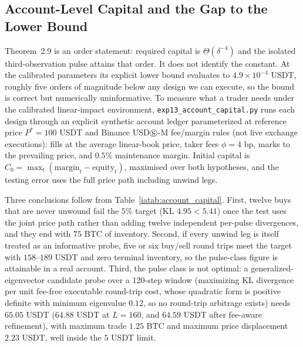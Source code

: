 \documentclass[12pt]{article}
\theoremstyle{definition}
\theoremstyle{remark}
\begin{document}
\subsection{Account-Level Capital and the Gap to the Lower Bound}
\label{ia:account_capital}

Theorem~2.9 is an order statement: required capital is $\Theta(\delta^{-4})$ and the isolated third-observation pulse attains that order. It does not identify the constant. At the calibrated parameters its explicit lower bound evaluates to $4.9\times10^{-4}$ USDT, roughly five orders of magnitude below any design we can execute, so the bound is correct but numerically uninformative. To measure what a trader needs under the calibrated linear-impact environment, \texttt{exp13\_account\_capital.py} runs each design through an explicit synthetic account ledger parameterized at reference price $P^* = 100$ USDT and Binance USD$\circledS$-M fee/margin rules (not live exchange executions): fills at the average linear-book price, taker fees $\phi=4$ bp, marks to the prevailing price, and $0.5\%$ maintenance margin. Initial capital is $C_0=\max_t(\text{margin}_t-\text{equity}_t)$, maximised over both hypotheses, and the testing error uses the full price path including unwind legs.



Three conclusions follow from Table~\ref{iatab:account_capital}. First, twelve buys that are never unwound fail the $5\%$ target (KL $4.95<5.41$) once the test uses the joint price path rather than adding twelve independent per-pulse divergences, and they end with $75$ BTC of inventory. Second, if every unwind leg is itself treated as an informative probe, five or six buy/sell round trips meet the target with $158$--$189$ USDT and zero terminal inventory, so the pulse-class figure is attainable in a real account. Third, the pulse class is not optimal: a generalized-eigenvector candidate probe over a 120-step window (maximizing KL divergence per unit fee-free executable round-trip cost, whose quadratic form is positive definite with minimum eigenvalue $0.12$, so no round-trip arbitrage exists) needs $65.05$ USDT ($64.88$ USDT at $L=160$, and $64.59$ USDT after fee-aware refinement), with maximum trade $1.25$ BTC and maximum price displacement $2.23$ USDT, well inside the $5$ USDT limit.
\end{document}
